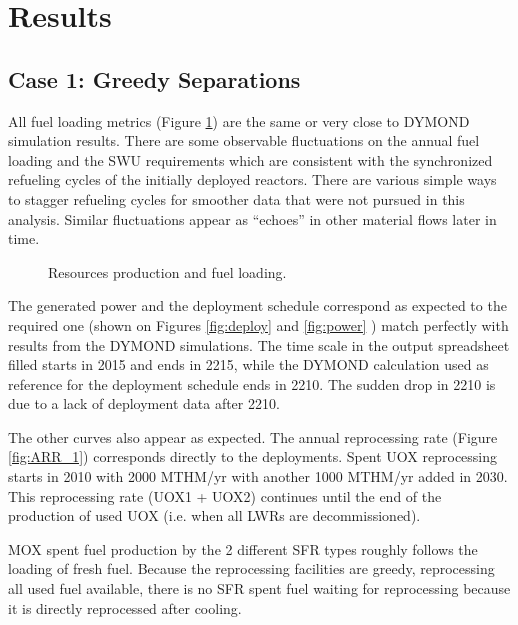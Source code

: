 \documentclass[12pt]{article}
\begin{document}
\section{Results}

\subsection{Case 1: Greedy Separations}

All fuel loading metrics (Figure \ref{fig:ResourceUsed}) are the same or very
close to DYMOND simulation results. There are some observable fluctuations on the
annual fuel loading and the SWU requirements which are consistent with the
synchronized refueling cycles of the initially deployed reactors.  There are
various simple ways to stagger refueling cycles for smoother data that were not
pursued in this analysis.  Similar fluctuations appear as ``echoes'' in other
material flows later in time.

\begin{figure}[h!]
    \centering
    \caption{Resources production and fuel loading.\label{fig:ResourceUsed} }
\end{figure}

The generated power and the deployment schedule correspond as expected to the
required one (shown on Figures \ref{fig:deploy} and \ref{fig:power} ) match
perfectly with results from the DYMOND simulations. The time scale in the output
spreadsheet filled starts in 2015 and ends in 2215, while the DYMOND calculation
used as reference for the deployment schedule ends in 2210. The sudden drop in
2210 is due to a lack of deployment data after 2210.


The other curves also appear as expected. The annual reprocessing rate (Figure
\ref{fig:ARR_1}) corresponds directly to the deployments. Spent UOX
reprocessing starts in 2010 with 2000 MTHM/yr with another 1000 MTHM/yr added in
2030. This reprocessing rate (UOX1 + UOX2) continues until the end of the
production of used UOX (i.e. when all LWRs are decommissioned).



MOX spent fuel production by the 2 different SFR types roughly follows the
loading of fresh fuel.  Because the reprocessing facilities are greedy,
reprocessing all used fuel available, there is no SFR spent fuel waiting for reprocessing
because it is directly reprocessed after cooling.
\end{document}
